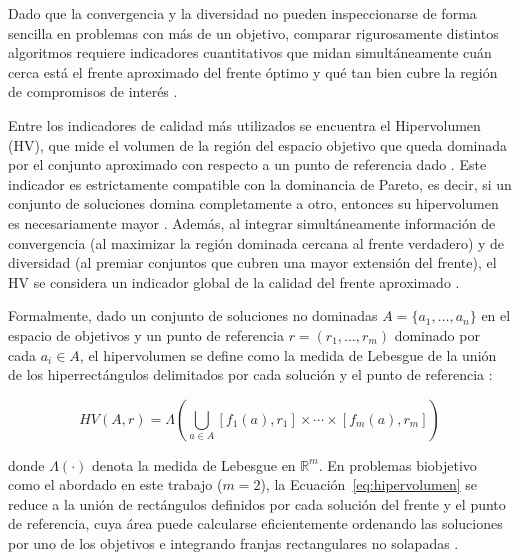 Dado que la convergencia y la diversidad no pueden inspeccionarse de forma sencilla en problemas con más de un objetivo, comparar rigurosamente distintos algoritmos requiere indicadores cuantitativos que midan simultáneamente cuán cerca está el frente aproximado del frente óptimo y qué tan bien cubre la región de compromisos de interés \cite{RAVBER2017qualityindicatorsMOEA, Shao2025_SMOEA}.

Entre los indicadores de calidad más utilizados se encuentra el Hipervolumen (HV), que mide el volumen de la región del espacio objetivo que queda dominada por el conjunto aproximado con respecto a un punto de referencia dado \cite{Auger2009HV, AUGER2012hv}. Este indicador es estrictamente compatible con la dominancia de Pareto, es decir, si un conjunto de soluciones domina completamente a otro, entonces su hipervolumen es necesariamente mayor \cite{Zitzler2007HV_revisited, Auger2009HV}. Además, al integrar simultáneamente información de convergencia (al maximizar la región dominada cercana al frente verdadero) y de diversidad (al premiar conjuntos que cubren una mayor extensión del frente), el HV se considera un indicador global de la calidad del frente aproximado \cite{Jiang2015HVMEOA, Auger2009HV}.

Formalmente, dado un conjunto de soluciones no dominadas $A=\{a_1,\ldots,a_n\}$ en el espacio de objetivos y un punto de referencia $r=(r_1,\ldots,r_m)$ dominado por cada $a_i\in A$, el hipervolumen se define como la medida de Lebesgue de la unión de los hiperrectángulos delimitados por cada solución y el punto de referencia \cite{Zitzler2007HV_revisited, Auger2009HV}:

\begin{equation}
    HV(A,r) = \Lambda\left(\bigcup_{a\in A}\left[f_1(a), r_1\right]\times\cdots\times\left[f_m(a), r_m\right]\right)
    \label{eq:hipervolumen}
\end{equation}

donde $\Lambda(\cdot)$ denota la medida de Lebesgue en $\mathbb{R}^m$. En problemas biobjetivo como el abordado en este trabajo ($m=2$), la Ecuación~\ref{eq:hipervolumen} se reduce a la unión de rectángulos definidos por cada solución del frente y el punto de referencia, cuya área puede calcularse eficientemente ordenando las soluciones por uno de los objetivos e integrando franjas rectangulares no solapadas \cite{Zitzler2007HV_revisited}.

